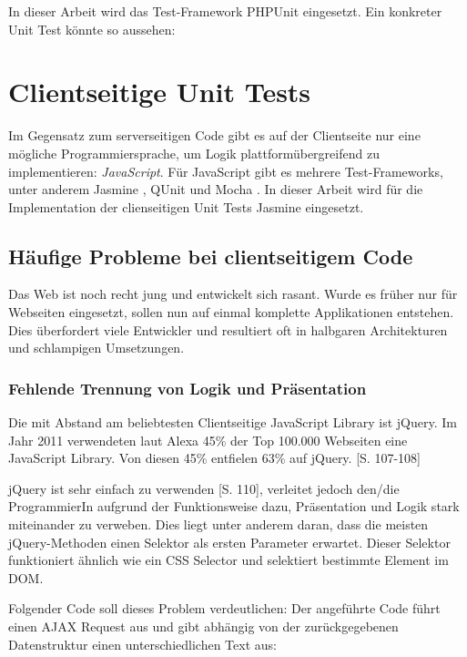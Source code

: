 \documentclass[a4paper,bibtotoc,oneside]{scrbook}
\begin{document}
In dieser Arbeit wird das Test-Framework PHPUnit eingesetzt. Ein konkreter Unit Test könnte so aussehen:





\section{Clientseitige Unit Tests}
Im Gegensatz zum serverseitigen Code gibt es auf der Clientseite nur eine mögliche Programmiersprache, um Logik plattformübergreifend zu implementieren: \emph{JavaScript}. Für JavaScript gibt es mehrere Test-Frameworks, unter anderem Jasmine \cite{jasmine}, QUnit \cite{qunit} und Mocha \cite{mocha}.
In dieser Arbeit wird für die Implementation der clienseitigen Unit Tests Jasmine eingesetzt.

\subsection{Häufige Probleme bei clientseitigem Code}
Das Web ist noch recht jung und entwickelt sich rasant. Wurde es früher nur für Webseiten eingesetzt, sollen nun auf einmal komplette Applikationen entstehen. Dies überfordert viele Entwickler und resultiert oft in halbgaren Architekturen und schlampigen Umsetzungen. 

\subsubsection{Fehlende Trennung von Logik und Präsentation}
Die mit Abstand am beliebtesten Clientseitige JavaScript Library ist jQuery. Im Jahr 2011 verwendeten laut Alexa 45\% der Top 100.000 Webseiten eine JavaScript Library. Von diesen 45\% entfielen 63\% auf jQuery. \cite{jquery}[S. 107-108]

jQuery ist sehr einfach zu verwenden \cite{jquery}[S. 110], verleitet jedoch den/die ProgrammierIn aufgrund der Funktionsweise dazu, Präsentation und Logik stark miteinander zu verweben. Dies liegt unter anderem daran, dass die meisten jQuery-Methoden einen Selektor als ersten Parameter erwartet. Dieser Selektor funktioniert ähnlich wie ein CSS Selector und selektiert bestimmte Element im DOM. \cite{jquery_selectors}

Folgender Code soll dieses Problem verdeutlichen: Der angeführte Code führt einen AJAX Request aus und gibt abhängig von der zurückgegebenen Datenstruktur einen unterschiedlichen Text aus:
\end{document}
